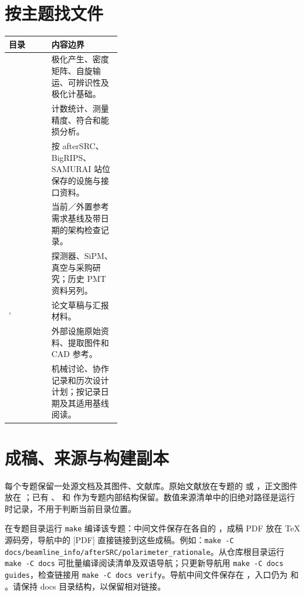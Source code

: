 \documentclass[UTF8,11pt,a4paper,fontset=none]{ctexart}
\begin{document}
\section{按主题找文件}
\noindent\begin{tabularx}{\linewidth}{@{}p{0.38\linewidth}Y@{}}
\toprule
目录 & 内容边界 \\
\midrule
{} & 极化产生、密度矩阵、自旋输运、可辨识性及极化计基础。\\
 & 计数统计、测量精度、符合和能损分析。\\
 & 按 afterSRC、BigRIPS、SAMURAI 站位保存的设施与接口资料。\\
 & 当前／外置参考需求基线及带日期的架构检查记录。\\
 & 探测器、SiPM、真空与采购研究；历史 PMT 资料另列。\\
,  & 论文草稿与汇报材料。\\
\newline{} & 外部设施原始资料、提取图件和 CAD 参考。\\
\newline{}\newline{} & 机械讨论、协作记录和历次设计计划；按记录日期及其适用基线阅读。\\
\bottomrule
\end{tabularx}

\section{成稿、来源与构建副本}
每个专题保留一处源文档及其图件、文献库。原始文献放在专题的  或 ，正文图件放在 ；已有 、 和  作为专题内部结构保留。数值来源清单中的旧绝对路径是运行时记录，不用于判断当前目录位置。

在专题目录运行 \texttt{make} 编译该专题：中间文件保存在各自的 ，成稿 PDF 放在 TeX 源码旁，导航中的 [PDF] 直接链接到这些成稿。例如：\texttt{make -C docs/beamline\_info/afterSRC/polarimeter\_rationale}。从仓库根目录运行 \texttt{make -C docs} 可批量编译阅读清单及双语导航；只更新导航用 \texttt{make -C docs guides}，检查链接用 \texttt{make -C docs verify}。导航中间文件保存在 ，入口仍为  和 。请保持 docs 目录结构，以保留相对链接。
\endgroup
\end{document}
